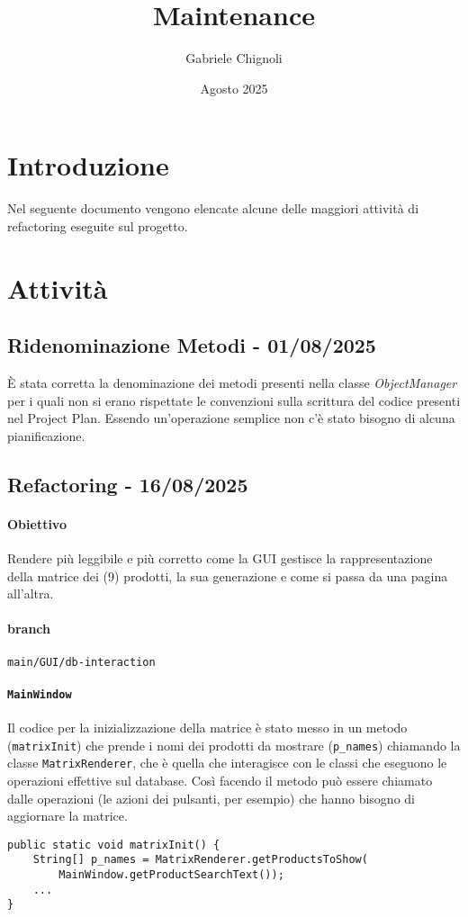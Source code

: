 \documentclass{article}
\title{\huge Maintenance}
\author{Gabriele Chignoli}
\date{Agosto 2025}
\begin{document}
\maketitle
\tableofcontents
\newpage

\section{Introduzione}
Nel seguente documento vengono elencate alcune delle maggiori attività di refactoring eseguite sul progetto. 

\section{Attività}
\subsection{Ridenominazione Metodi - 01/08/2025}
\`E stata corretta la denominazione dei metodi presenti nella classe \textit{ObjectManager} per i quali non si erano rispettate le convenzioni sulla scrittura del codice presenti nel Project Plan. Essendo un'operazione semplice non c'è stato bisogno di alcuna pianificazione. 

\subsection{Refactoring - 16/08/2025}
\paragraph{Obiettivo} Rendere più leggibile e più corretto come la GUI gestisce la rappresentazione della matrice dei (9) prodotti, la sua generazione e come si passa da una pagina all'altra. 
\paragraph{branch} 
\begin{code*}{}
\begin{center}
\texttt{main/GUI/db-interaction}
\end{center}
\end{code*}
\paragraph{\texttt{MainWindow}} Il codice per la inizializzazione della matrice è stato messo in un metodo (\texttt{matrixInit}) che prende i nomi dei prodotti da mostrare (\texttt{p\_names}) chiamando la classe \texttt{MatrixRenderer}, che è quella che interagisce con le classi che eseguono le operazioni effettive sul database. Così facendo il metodo può essere chiamato dalle operazioni (le azioni dei pulsanti, per esempio) che hanno bisogno di aggiornare la matrice. 
\begin{code*}{}
\begin{verbatim}
public static void matrixInit() {
    String[] p_names = MatrixRenderer.getProductsToShow(
        MainWindow.getProductSearchText());
    ...
}
\end{verbatim}
\end{code*}
\end{document}
